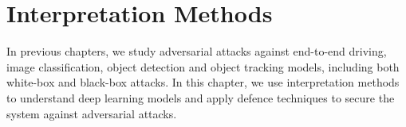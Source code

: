 \chapter{Interpretation Methods}
\label{chpt:defence}


In previous chapters, we study adversarial attacks against end-to-end driving, image classification, object detection and object tracking models, including both white-box and black-box attacks. In this chapter, we use interpretation methods to understand deep learning models and apply defence techniques to secure the system against adversarial attacks.







